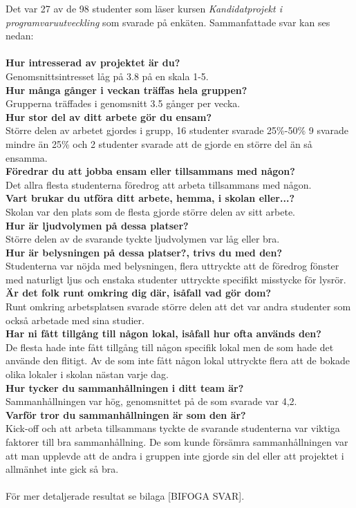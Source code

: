 Det var 27 av de 98 studenter som läser kursen \textit{Kandidatprojekt i programvaruutveckling} som svarade på enkäten. Sammanfattade svar kan ses nedan:\\
\\\textbf{Hur intresserad av projektet är du?}\\ 
Genomsnittsintresset låg på 3.8 på en skala 1-5.\\
\textbf{Hur många gånger i veckan träffas hela gruppen?}\\
Grupperna träffades i genomsnitt 3.5 gånger per vecka.\\
\textbf{Hur stor del av ditt arbete gör du ensam?}\\
Större delen av arbetet gjordes i grupp, 16 studenter svarade 25\%-50\% 9 svarade  mindre än 25\% och 2 studenter svarade att de gjorde en större del än så ensamma.\\
\textbf{Föredrar du att jobba ensam eller tillsammans med någon?}\\
Det allra flesta studenterna föredrog att arbeta tillsammans med någon.\\
\textbf{Vart brukar du utföra ditt arbete, hemma, i skolan eller...?}\\
Skolan var den plats som de flesta gjorde större delen av sitt arbete. \\
\textbf{Hur är ljudvolymen på dessa platser?}\\
Större delen av de svarande tyckte ljudvolymen var låg eller bra.\\
\textbf{Hur är belysningen på dessa platser?, trivs du med den?}\\
Studenterna var nöjda med belysningen, flera uttryckte att de föredrog fönster med naturligt ljus och enstaka studenter uttryckte specifikt misstycke för lysrör.
\textbf{Är det folk runt omkring dig där, isåfall vad gör dom?}\\
Runt omkring arbetsplatsen svarade större delen att det var andra studenter som också arbetade med sina studier.\\
\textbf{Har ni fått tillgång till någon lokal, isåfall hur ofta används den?}\\
De flesta hade inte fått tillgång till någon specifik lokal men de som hade det använde den flitigt. Av de som inte fått någon lokal uttryckte flera att de bokade olika lokaler i skolan nästan varje dag.\\
\textbf{Hur tycker du sammanhållningen i ditt team är?}\\
Sammanhållningen var hög, genomsnittet på de som svarade var 4,2.\\
\textbf{Varför tror du sammanhållningen är som den är?}\\
Kick-off och att arbeta tillsammans tyckte de svarande studenterna var viktiga faktorer till bra sammanhållning. De som kunde försämra sammanhållningen var att man upplevde att de andra i gruppen inte gjorde sin del eller att projektet i allmänhet inte gick så bra.\\\\För mer detaljerade resultat se bilaga [BIFOGA SVAR].

